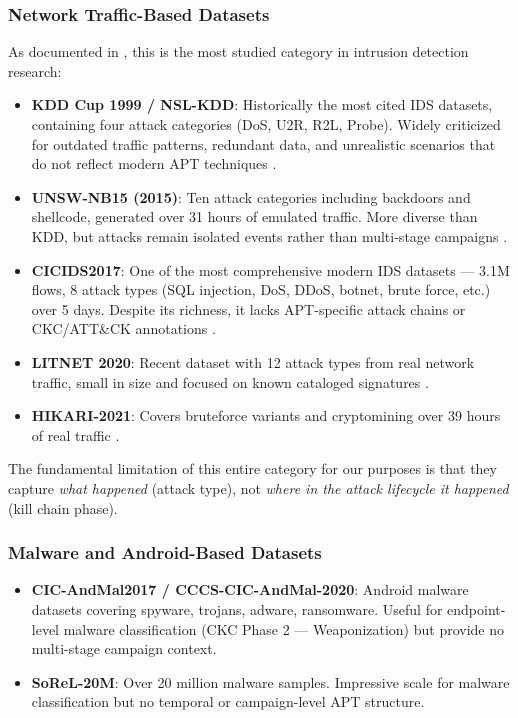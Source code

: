 \subsubsection{Network Traffic-Based Datasets}

As documented in \cite{ankalaki2025cyber}, this is the most studied category in intrusion detection research:

\begin{itemize}
    \item \textbf{KDD Cup 1999 / NSL-KDD}: Historically the most cited IDS datasets, containing four attack categories (DoS, U2R, R2L, Probe). Widely criticized for outdated traffic patterns, redundant data, and unrealistic scenarios that do not reflect modern APT techniques \cite{ankalaki2025cyber}.
    \item \textbf{UNSW-NB15 (2015)}: Ten attack categories including backdoors and shellcode, generated over 31 hours of emulated traffic. More diverse than KDD, but attacks remain isolated events rather than multi-stage campaigns \cite{ankalaki2025cyber}.
    \item \textbf{CICIDS2017}: One of the most comprehensive modern IDS datasets --- 3.1M flows, 8 attack types (SQL injection, DoS, DDoS, botnet, brute force, etc.) over 5 days. Despite its richness, it lacks APT-specific attack chains or CKC/ATT\&CK annotations \cite{ankalaki2025cyber}.
    \item \textbf{LITNET 2020}: Recent dataset with 12 attack types from real network traffic, small in size and focused on known cataloged signatures \cite{ankalaki2025cyber}.
    \item \textbf{HIKARI-2021}: Covers bruteforce variants and cryptomining over 39 hours of real traffic \cite{ankalaki2025cyber}.
\end{itemize}

The fundamental limitation of this entire category for our purposes is that they capture \textit{what happened} (attack type), not \textit{where in the attack lifecycle it happened} (kill chain phase).

\subsubsection{Malware and Android-Based Datasets}

\begin{itemize}
    \item \textbf{CIC-AndMal2017 / CCCS-CIC-AndMal-2020}: Android malware datasets covering spyware, trojans, adware, ransomware. Useful for endpoint-level malware classification (CKC Phase 2 --- Weaponization) but provide no multi-stage campaign context.
    \item \textbf{SoReL-20M}: Over 20 million malware samples. Impressive scale for malware classification but no temporal or campaign-level APT structure.
\end{itemize}


